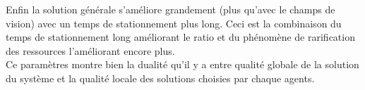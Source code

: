 Enfin la solution générale s'améliore grandement (plus qu'avec le champs de vision) avec un temps de stationnement plus long. Ceci est la combinaison du temps de stationnement long améliorant le ratio et du phénomène de rarification des ressources l'améliorant encore plus.\\

Ce paramètres montre bien la dualité qu'il y a entre qualité globale de la solution du système et la qualité locale des solutions choisies par chaque agents.

\begin{figure}
  \begin{center}
    
    

\end{center}
\end{figure}
